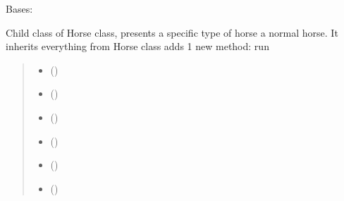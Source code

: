 \documentclass[letterpaper,10pt,english]{sphinxmanual}
\begin{document}

\begin{fulllineitems}
\label{\detokenize{main_package:main_package.Horse.Normal}}
\pysigstartsignatures
{}
\pysigstopsignatures
\sphinxAtStartPar
Bases: {\hyperref[\detokenize{main_package:main_package.Horse.Horse}]{}}

\sphinxAtStartPar
Child class of Horse class, presents a specific type of horse \sphinxhyphen{} a normal horse. It inherits everything from Horse class
adds 1 new method: run
\begin{quote}\begin{description}
\begin{itemize}
\item {} 
\sphinxAtStartPar
{} ()

\item {} 
\sphinxAtStartPar
{} ()

\item {} 
\sphinxAtStartPar
{} ()

\item {} 
\sphinxAtStartPar
{} ()

\item {} 
\sphinxAtStartPar
{} ()

\item {} 
\sphinxAtStartPar
{} ()

\end{itemize}


\end{description}
\end{quote}
\end{fulllineitems}
\end{document}
